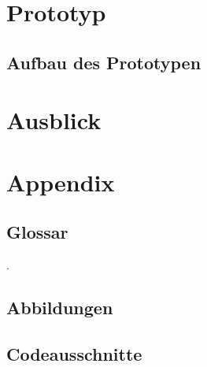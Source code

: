 \documentclass[12pt]{article}
\newcommand\blankpage{%
    \null
    \thispagestyle{empty}%
    \addtocounter{page}{-1}%
    \newpage}
\begin{document}
%

\newpage %
\blankpage
\section{Prototyp}

\subsection{Aufbau des Prototypen}

\newpage %

\newpage %
\mbox{}
\newpage
\blankpage
\section{Ausblick}


\newpage %
\cfoot{}
\section{Appendix}
\label{sec:appenix}

\subsection{Glossar}
\label{subsec:glossaries}
\begingroup
\renewcommand{\section}[2]{}
\printglossary[style=tree]
\endgroup
\newpage

{\small\color{white}.}
\vspace{-2cm}
\subsection{Abbildungen}
\label{subsec:figures}
\begingroup
\renewcommand{\section}[2]{}
\listoffigures
\endgroup

\newpage
\subsection{Codeausschnitte}
\label{subsec:listings}
\begingroup
\renewcommand{\section}[2]{}
\lstlistoflistings
\endgroup
\end{document}
